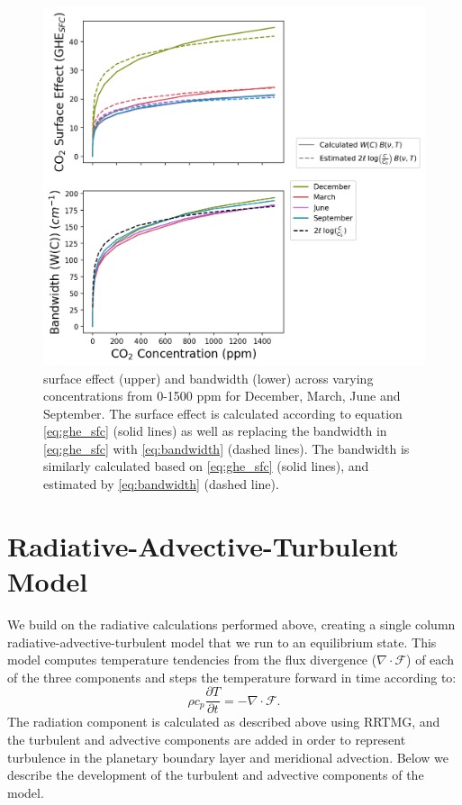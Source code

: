 \documentclass[draft]{agujournal2019}
\begin{document}
\begin{figure}[htb!]
\noindent\includegraphics[width=1\textwidth]{figures/sfc_bandwidth_and_co2.png}
\centering
\caption{ surface effect (upper) and bandwidth (lower) across varying  concentrations from 0-1500 ppm for December, March, June and September. The  surface effect is calculated according to equation \ref{eq:ghe_sfc} (solid lines) as well as replacing the bandwidth in \ref{eq:ghe_sfc} with \ref{eq:bandwidth} (dashed lines). The bandwidth is similarly calculated based on \ref{eq:ghe_sfc} (solid lines), and estimated by \ref{eq:bandwidth} (dashed line).}
\label{fig:sfc_bandwidth_co2}
\end{figure}


\section{Radiative-Advective-Turbulent Model}

We build on the radiative calculations performed above, creating a single column radiative-advective-turbulent model that we run to an equilibrium state. This model computes temperature tendencies from the flux divergence ($\nabla \cdot \mathcal{F}$) of each of the three components and steps the temperature forward in time according to:
\begin{equation}
    \rho c_{p} \frac{\partial T}{\partial t} = -\nabla \cdot \mathbf{\mathcal{F}}.
\end{equation}
The radiation component is calculated as described above using RRTMG, and the turbulent and advective components are added in order to represent turbulence in the planetary boundary layer and meridional advection. Below we describe the development of the turbulent and advective components of the model.
\end{document}
